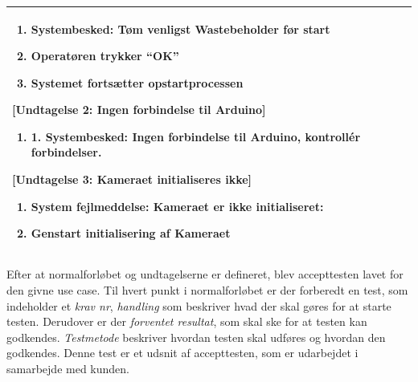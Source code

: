 \begin{center}
\begin{longtable}{ | m{4cm} | m{8cm}| }
			\begin{enumerate}
			\item Systembesked: Tøm venligst Wastebeholder før start
			\item Operatøren trykker “OK”
			\item Systemet fortsætter opstartprocessen
			\end{enumerate} 
			
			[Undtagelse 2: Ingen forbindelse til Arduino]
			
			\begin{enumerate}
			\item 1.	Systembesked: Ingen forbindelse til Arduino, kontrollér forbindelser.
			\end{enumerate} 
	
			[Undtagelse 3: Kameraet initialiseres ikke]
			
			\begin{enumerate}
			\item System fejlmeddelse: Kameraet er ikke initialiseret:
			\item Genstart initialisering af Kameraet
			\end{enumerate} \\
			\hline
		\end{longtable}
		
	\end{center}

Efter at normalforløbet og undtagelserne er defineret, blev accepttesten lavet for den givne use case. Til hvert punkt i normalforløbet er der forberedt en test, som indeholder et \textit{krav nr}, \textit{handling} som beskriver hvad der skal gøres for at starte testen. Derudover er der \textit{forventet resultat}, som skal ske for at testen kan godkendes. \textit{Testmetode} beskriver hvordan testen skal udføres og hvordan den godkendes. Denne test er et udsnit af accepttesten, som er udarbejdet i samarbejde med kunden.

